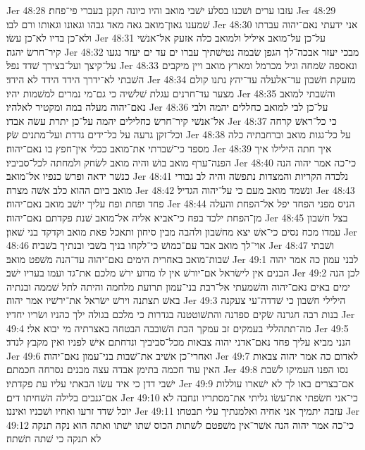 Jer 48:28  עזבו ערים ושׁכנו בסלע ישׁבי מואב והיו כיונה תקנן בעברי פי־פחת׃
Jer 48:29  שׁמענו גאון־מואב גאה מאד גבהו וגאונו וגאותו ורם לבו׃
Jer 48:30  אני ידעתי נאם־יהוה עברתו ולא־כן בדיו לא־כן עשׂו׃
Jer 48:31  על־כן על־מואב איליל ולמואב כלה אזעק אל־אנשׁי קיר־חרשׂ יהגה׃
Jer 48:32  מבכי יעזר אבכה־לך הגפן שׂבמה נטישׁתיך עברו ים עד ים יעזר נגעו על־קיצך ועל־בצירך שׁדד נפל׃
Jer 48:33  ונאספה שׂמחה וגיל מכרמל ומארץ מואב ויין מיקבים השׁבתי לא־ידרך הידד הידד לא הידד׃
Jer 48:34  מזעקת חשׁבון עד־אלעלה עד־יהץ נתנו קולם מצער עד־חרנים עגלת שׁלשׁיה כי גם־מי נמרים למשׁמות יהיו׃
Jer 48:35  והשׁבתי למואב נאם־יהוה מעלה במה ומקטיר לאלהיו׃
Jer 48:36  על־כן לבי למואב כחללים יהמה ולבי אל־אנשׁי קיר־חרשׂ כחלילים יהמה על־כן יתרת עשׂה אבדו׃
Jer 48:37  כי כל־ראשׁ קרחה וכל־זקן גרעה על כל־ידים גדדת ועל־מתנים שׂק׃
Jer 48:38  על כל־גגות מואב וברחבתיה כלה מספד כי־שׁברתי את־מואב ככלי אין־חפץ בו נאם־יהוה׃
Jer 48:39  איך חתה הילילו איך הפנה־ערף מואב בושׁ והיה מואב לשׂחק ולמחתה לכל־סביביו׃
Jer 48:40  כי־כה אמר יהוה הנה כנשׁר ידאה ופרשׂ כנפיו אל־מואב׃
Jer 48:41  נלכדה הקריות והמצדות נתפשׂה והיה לב גבורי מואב ביום ההוא כלב אשׁה מצרה׃
Jer 48:42  ונשׁמד מואב מעם כי על־יהוה הגדיל׃
Jer 48:43  פחד ופחת ופח עליך יושׁב מואב נאם־יהוה׃
Jer 48:44  הניס מפני הפחד יפל אל־הפחת והעלה מן־הפחת ילכד בפח כי־אביא אליה אל־מואב שׁנת פקדתם נאם־יהוה׃
Jer 48:45  בצל חשׁבון עמדו מכח נסים כי־אשׁ יצא מחשׁבון ולהבה מבין סיחון ותאכל פאת מואב וקדקד בני שׁאון׃
Jer 48:46  אוי־לך מואב אבד עם־כמושׁ כי־לקחו בניך בשׁבי ובנתיך בשׁביה׃
Jer 48:47  ושׁבתי שׁבות־מואב באחרית הימים נאם־יהוה עד־הנה משׁפט מואב׃
Jer 49:1  לבני עמון כה אמר יהוה הבנים אין לישׂראל אם־יורשׁ אין לו מדוע ירשׁ מלכם את־גד ועמו בעריו ישׁב׃
Jer 49:2  לכן הנה ימים באים נאם־יהוה והשׁמעתי אל־רבת בני־עמון תרועת מלחמה והיתה לתל שׁממה ובנתיה באשׁ תצתנה וירשׁ ישׂראל את־ירשׁיו אמר יהוה׃
Jer 49:3  הילילי חשׁבון כי שׁדדה־עי צעקנה בנות רבה חגרנה שׂקים ספדנה והתשׁוטטנה בגדרות כי מלכם בגולה ילך כהניו ושׂריו יחדיו׃
Jer 49:4  מה־תתהללי בעמקים זב עמקך הבת השׁובבה הבטחה באצרתיה מי יבוא אלי׃
Jer 49:5  הנני מביא עליך פחד נאם־אדני יהוה צבאות מכל־סביביך ונדחתם אישׁ לפניו ואין מקבץ לנדד׃
Jer 49:6  ואחרי־כן אשׁיב את־שׁבות בני־עמון נאם־יהוה׃
Jer 49:7  לאדום כה אמר יהוה צבאות האין עוד חכמה בתימן אבדה עצה מבנים נסרחה חכמתם׃
Jer 49:8  נסו הפנו העמיקו לשׁבת ישׁבי דדן כי איד עשׂו הבאתי עליו עת פקדתיו׃
Jer 49:9  אם־בצרים באו לך לא ישׁארו עוללות אם־גנבים בלילה השׁחיתו דים׃
Jer 49:10  כי־אני חשׂפתי את־עשׂו גליתי את־מסתריו ונחבה לא יוכל שׁדד זרעו ואחיו ושׁכניו ואיננו׃
Jer 49:11  עזבה יתמיך אני אחיה ואלמנתיך עלי תבטחו׃
Jer 49:12  כי־כה אמר יהוה הנה אשׁר־אין משׁפטם לשׁתות הכוס שׁתו ישׁתו ואתה הוא נקה תנקה לא תנקה כי שׁתה תשׁתה׃
